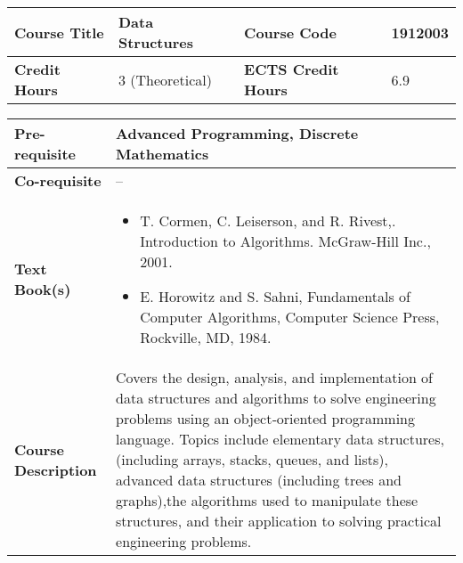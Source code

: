 \documentclass[12pt]{article}
\begin{document}
\bigskip
\bigskip



\begin{minipage}{\textwidth}
\begin{tabularx}{\textwidth}{|l|X|l|X|}
\hline
\textbf{Course Title}       &   Data Structures & \textbf{Course Code}       & 1912003  \\ \hline
\textbf{Credit Hours}       &  3 (Theoretical) & \textbf{ECTS Credit Hours}       &  6.9  \\ \hline
\end{tabularx}

\begin{tabularx}{\textwidth}{|l|X|}
\hline
\textbf{Pre-requisite}      &  Advanced Programming, Discrete Mathematics \\ \hline
\textbf{Co-requisite}       &  -- \\ \hline
\textbf{Text Book(s)}      & \begin{minipage}{.70\textwidth}
					\begin{itemize} \itemsep-0.4em
						\vspace{3mm}
						\item T. Cormen, C. Leiserson, and R. Rivest,. Introduction to Algorithms. McGraw-Hill Inc., 2001.
					           \item E. Horowitz and S. Sahni, Fundamentals of Computer Algorithms, Computer Science Press, Rockville, MD, 1984.
						\vspace{3mm}
					\end{itemize}
				\end{minipage}  \\ \hline
\textbf{Course Description} & \begin{minipage}{.70\textwidth}
					\vspace{3mm}
					Covers the design, analysis, and implementation of data structures and algorithms to solve engineering
					problems using an object‐oriented programming language. Topics include elementary data structures,
					(including arrays, stacks, queues, and lists), advanced data structures (including trees and graphs),the
					algorithms used to manipulate these structures, and their application to solving practical engineering
					problems.

					\vspace{3mm}
					\end{minipage} \\ \hline
\end{tabularx}
\end{minipage}
\end{document}
